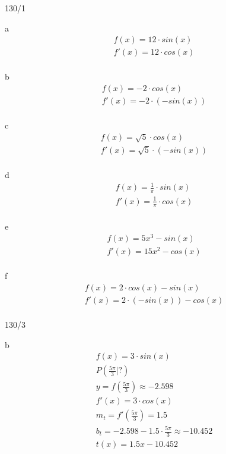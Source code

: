 \begin{exercise}{130/1}
  \item[a]
  \begin{gather*}
    f(x) = 12 \cdot sin(x) \\
    f'(x) = 12 \cdot cos(x) \\
  \end{gather*}
  \item[b]
  \begin{gather*}
    f(x) = -2 \cdot cos(x) \\
    f'(x) = -2 \cdot (-sin(x)) \\
  \end{gather*}
  \item[c]
  \begin{gather*}
    f(x) = \sqrt{5} \cdot cos(x) \\
    f'(x) = \sqrt{5} \cdot (-sin(x)) \\
  \end{gather*}
  \item[d]
  \begin{gather*}
    f(x) = \frac{1}{\pi} \cdot sin(x) \\
    f'(x) = \frac{1}{\pi} \cdot cos(x) \\
  \end{gather*}
  \item[e]
  \begin{gather*}
    f(x) = 5x^3 - sin(x) \\
    f'(x) = 15x^2 - cos(x) \\
  \end{gather*}
  \item[f]
  \begin{gather*}
    f(x) = 2 \cdot cos(x) - sin(x) \\
    f'(x) = 2 \cdot (-sin(x)) - cos(x) \\
  \end{gather*}
\end{exercise}
\begin{exercise}{130/3}
  \item [b]
  \begin{gather*}
    f(x) = 3 \cdot sin(x) \\
    P(\frac{5\pi}{3}|?) \\
    y = f(\frac{5\pi}{3}) \approx -2.598 \\
    f'(x) = 3 \cdot cos(x) \\
    m_t = f'(\frac{5\pi}{3}) = 1.5 \\
    b_t = -2.598 - 1.5 \cdot \frac{5\pi}{3} \approx -10.452 \\
    t(x) = 1.5x - 10.452
  \end{gather*}
\end{exercise}
